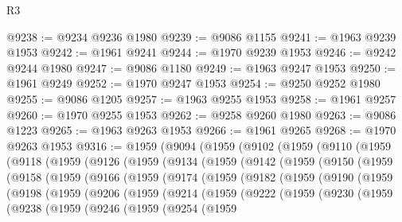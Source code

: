 \begin{lexlean}{R3}
\begin{coremodule}
@9238 := @9234 @9236 @1980
@9239 := @9086 @1155
@9241 := @1963 @9239 @1953
@9242 := @1961 @9241
@9244 := @1970 @9239 @1953
@9246 := @9242 @9244 @1980
@9247 := @9086 @1180
@9249 := @1963 @9247 @1953
@9250 := @1961 @9249
@9252 := @1970 @9247 @1953
@9254 := @9250 @9252 @1980
@9255 := @9086 @1205
@9257 := @1963 @9255 @1953
@9258 := @1961 @9257
@9260 := @1970 @9255 @1953
@9262 := @9258 @9260 @1980
@9263 := @9086 @1223
@9265 := @1963 @9263 @1953
@9266 := @1961 @9265
@9268 := @1970 @9263 @1953
@9316 := @1959
    (@9094
      (@1959
        (@9102
          (@1959
            (@9110
              (@1959
                (@9118
                  (@1959
                    (@9126
                      (@1959
                        (@9134
                          (@1959
                            (@9142
                              (@1959
                                (@9150
                                  (@1959
                                    (@9158
                                      (@1959
                                        (@9166
                                          (@1959
                                            (@9174
                                              (@1959
                                                (@9182
                                                  (@1959
                                                    (@9190
                                                      (@1959
                                                        (@9198
                                                          (@1959
                                                            (@9206
                                                              (@1959
                                                                (@9214
                                                                  (@1959
                                                                    (@9222
                                                                      (@1959
                                                                        (@9230
                                                                          (@1959
                                                                            (@9238
                                                                              (@1959
                                                                                (@9246
                                                                                  (@1959
                                                                                    (@9254
                                                                                      (@1959

\end{coremodule}
\end{lexlean}

